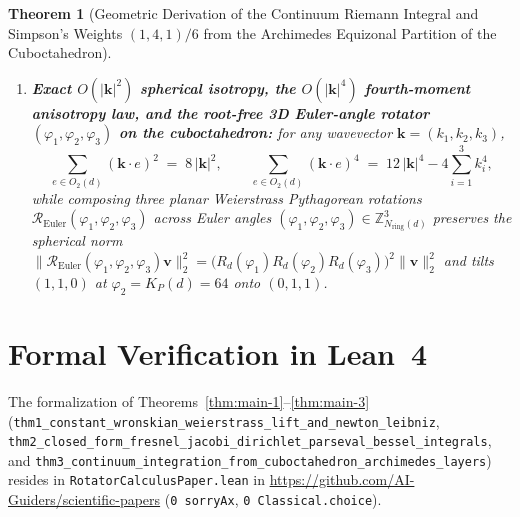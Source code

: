 \documentclass[11pt,a4paper]{article}
\theoremstyle{plain}
\newtheorem{theorem}{Theorem}[section]
\theoremstyle{definition}
\begin{document}
\begin{theorem}[Geometric Derivation of the Continuum Riemann Integral and Simpson's Weights $(1,4,1)/6$ from the Archimedes Equizonal Partition of the Cuboctahedron]
\begin{enumerate}[label=\textbf{(\roman*)},leftmargin=*]
  on the Weierstrass $n$-gon with step $s = N_{\mathrm{ring}}(d)/n$, the inscribed and circumscribed rational estimators $\pi_{\mathrm{in}}(n)$ and $\pi_{\mathrm{out}}(n)$ obey the exact \emph{Wronskian-cube bracket identity}
  \begin{equation}
    \label{eq:wronskian-cube-pi-gap}
    \pi_{\mathrm{out}}(n) - \pi_{\mathrm{in}}(n) \;=\; \sum_{j=0}^{n/2-1}\frac{W_s(js)^3}{I_s(js)\,R_d(js)\,R_d((j+1)s)} \;>\; 0,
  \end{equation}
  so under every polygon doubling $n\mapsto 2n$ the bracket width contracts by $2^d/\|e\|_2^2 = d_{\mathrm{in}}(\square) = 4$, while the Verlet-parabola rational sine operator $\sin_{\mathrm{rat}}(d;\,p,q) = \frac{d_{\mathrm{in}}(\square)\,p(\|e\|_2^2 q - p)}{d_{\mathrm{out}}(E)(d)\,q^2 - p(\|e\|_2^2 q - p)}$ at $p/q\in\{1/d^2,\,1/d,\,1/\|e\|_2^2,\,\|e\|_2^2/d,\,1\}$ ($10^\circ,30^\circ,45^\circ,60^\circ,90^\circ$) returns $\frac{17}{97},\,\frac{1}{2},\,\frac{12}{17},\,\frac{32}{37},\,1$.
\item \textbf{Exact $O(|\mathbf{k}|^2)$ spherical isotropy, the $O(|\mathbf{k}|^4)$ fourth-moment anisotropy law, and the root-free 3D Euler-angle rotator $(\varphi_1,\varphi_2,\varphi_3)$ on the cuboctahedron:}
  for any wavevector $\mathbf{k}=(k_1,k_2,k_3)$,
  \begin{equation}
    \label{eq:cuboct-second-fourth-moments}
    \sum_{e\in O_2(d)} (\mathbf{k}\cdot e)^2 \;=\; 8\,|\mathbf{k}|^2,\qquad
    \sum_{e\in O_2(d)} (\mathbf{k}\cdot e)^4 \;=\; 12\,|\mathbf{k}|^4 - 4\sum_{i=1}^3 k_i^4,
  \end{equation}
  while composing three planar Weierstrass Pythagorean rotations $\mathcal{R}_{\mathrm{Euler}}(\varphi_1,\varphi_2,\varphi_3)$ across Euler angles $(\varphi_1,\varphi_2,\varphi_3)\in\mathbb{Z}_{N_{\mathrm{ring}}(d)}^3$ preserves the spherical norm $\|\mathcal{R}_{\mathrm{Euler}}(\varphi_1,\varphi_2,\varphi_3)\mathbf{v}\|_2^2 = \bigl(R_d(\varphi_1)R_d(\varphi_2)R_d(\varphi_3)\bigr)^2\|\mathbf{v}\|_2^2$ and tilts $(1,1,0)$ at $\varphi_2 = K_P(d)=64$ onto $(0,1,1)$.
\end{enumerate}
\end{theorem}

\section{Formal Verification in Lean~4}
\label{sec:lean4}

The formalization of Theorems~\ref{thm:main-1}--\ref{thm:main-3} (\texttt{thm1\_constant\_wronskian\_weierstrass\_lift\_and\_newton\_leibniz}, \texttt{thm2\_closed\_form\_fresnel\_jacobi\_dirichlet\_parseval\_bessel\_integrals}, and \texttt{thm3\_continuum\_integration\_from\_cuboctahedron\_archimedes\_layers}) resides in \texttt{RotatorCalculusPaper.lean} in \url{https://github.com/AI-Guiders/scientific-papers} (\texttt{0 sorryAx}, \texttt{0 Classical.choice}).
\end{document}

